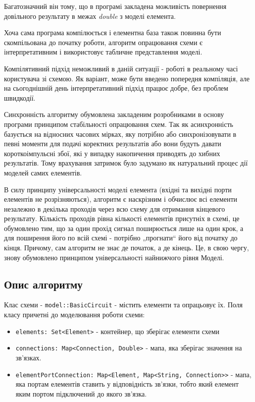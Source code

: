 \documentclass[12pt,a4paper]{article}
\begin{document}
Багатозначний він тому, що в програмі закладена можливість повернення довільного результату в межах \emph{double} з моделі елемента.

Хоча сама програма компілюється і елементна база також повинна бути скомпільована до початку роботи, алгоритм опрацювання схеми є інтерпретативним і використовує табличне представлення моделі.

Компілятивний підхід неможливий в даній ситуації - роботі в реальному часі користувача зі схемою. Як варіант, може бути введено попередня компіляція, але на сьогоднішній день інтерпретативний підхід працює добре, без проблем швидкодії.

Синхронність алгоритму обумовлена закладеним розробниками в основу програми принципом стабільності опрацювання схем. Так як асинхронність базується на відносних часових мірках, яку потрібно або синхронізовувати в певні моменти для подачі коректних результатів або вони будуть давати короткоімпульсні збої, які у випадку накопичення приводять до хибних результатів. Тому врахування затримок було задумано як натуральний процес дії моделей самих елементів.

В силу принципу універсальності моделі елемента (вхідні та вихідні порти елементів не розрізняються), алгоритм є наскрізним і обчислює всі елементи незалежно в декілька проходів через всю схему для отримання кінцевого результату. Кількість проходів рівна кількості елементів присутніх в схемі, це обумовлено тим, що за один прохід сигнал поширюється лише на один крок, а для поширення його по всій схемі - потрібно „прогнати“ його від початку до кінця. Причому, сам алгоритм не знає де початок, а де кінець. Це, в свою чергу, знову обумовлено принципом універсальності найнижчого рівня Моделі.

\subsection{Опис алгоритму}

Клас схеми - \lstinline$model::BasicCircuit$ - містить елементи та опрацьовує їх.
Поля класу причетні до моделювання роботи схеми:
\begin{itemize}
  \item \lstinline$elements: Set<Element>$ - контейнер, що зберігає елементи схеми
  \item \lstinline$connections: Map<Connection, Double>$ - мапа, яка зберігає значення на зв’язках.
  \item \lstinline$elementPortConnection: Map<Element, Map<String, Connection>>$ - мапа, яка портам елементів ставить у відповідність зв’язки, тобто який елемент яким портом підключений до якого зв’язка.
\end{itemize}
\end{document}
